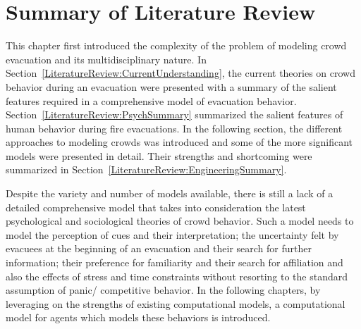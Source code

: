 \section{Summary of Literature Review}
\label{LiteratureReview:Summary}
This chapter first introduced the complexity of the problem of modeling crowd evacuation and its multidisciplinary nature. In Section~\ref{LiteratureReview:CurrentUnderstanding}, the current theories on crowd behavior during an evacuation were presented with a summary of the salient features required in a comprehensive model of evacuation behavior. Section~\ref{LiteratureReview:PsychSummary} summarized the salient features of human behavior during fire evacuations. In the following section, the different approaches to modeling crowds was introduced and some of the more significant models were presented in detail. Their strengths and shortcoming were summarized in Section~\ref{LiteratureReview:EngineeringSummary}.

 Despite the variety and number of models available, there is still a lack of a detailed comprehensive model that takes into consideration the latest psychological and sociological theories of crowd behavior. Such a model needs to model the perception of cues and their interpretation; the uncertainty felt by evacuees at the beginning of an evacuation and their search for further information; their preference for familiarity and their search for affiliation and also the effects of stress and time constraints without resorting to the standard assumption of panic/ competitive behavior. In the following chapters, by leveraging on the strengths of existing computational models, a computational model for agents which models these behaviors is introduced.



